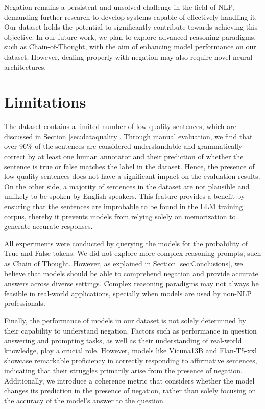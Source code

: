 \documentclass[11pt]{article}
\begin{document}
Negation remains a persistent and unsolved challenge in the field of NLP, demanding further research to develop systems capable of effectively handling it. Our dataset holds the potential to significantly contribute towards achieving this objective. In our future work, we plan to explore advanced reasoning paradigms, such as Chain-of-Thought, with the aim of enhancing model performance on our dataset. However, dealing properly with negation may also require novel neural architectures.





\section*{Limitations}

The dataset contains a limited number of low-quality sentences, which are discussed in Section \ref{sec:dataquality}. Through manual evaluation, we find that over 96\% of the sentences are considered understandable and grammatically correct by at least one human annotator and their prediction of whether the sentence is true or false matches the label in the dataset. Hence, the presence of low-quality sentences does not have a significant impact on the evaluation results. On the other side, a majority of sentences in the dataset are not plausible and unlikely to be spoken by English speakers. This feature provides a benefit by ensuring that the sentences are improbable to be found in the LLM training corpus, thereby it prevents models from relying solely on memorization to generate accurate responses.

All experiments were conducted by querying the models for the probability of True and False tokens. We did not explore more complex reasoning prompts, such as Chain of Thought. However, as explained in Section \ref{sec:Conclusions}, we believe that models should be able to comprehend negation and provide accurate answers across diverse settings. Complex reasoning paradigms may not always be feasible in real-world applications, specially when models are used by non-NLP professionals. 

Finally, the performance of models in our dataset is not solely determined by their capability to understand negation. Factors such as performance in question answering and prompting tasks, as well as their understanding of real-world knowledge, play a crucial role. However, models like Vicuna13B and Flan-T5-xxl showcase remarkable proficiency in correctly responding to affirmative sentences, indicating that their struggles primarily arise from the presence of negation. Additionally, we introduce a coherence metric that considers whether the model changes its prediction in the presence of negation, rather than solely focusing on the accuracy of the model's answer to the question.
\end{document}
